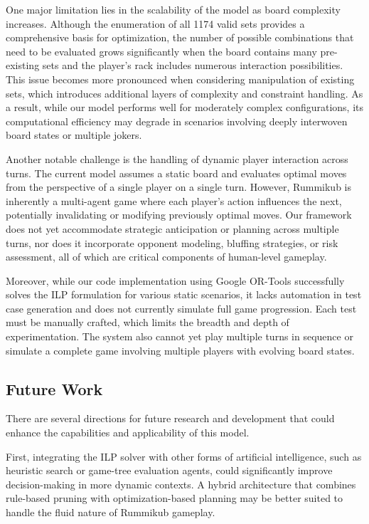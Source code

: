 \documentclass[11pt,letterpaper]{article}
\begin{document}
One major limitation lies in the scalability of the model as board complexity increases. Although the enumeration of all 1174 valid sets provides a comprehensive basis for optimization, the number of possible combinations that need to be evaluated grows significantly when the board contains many pre-existing sets and the player’s rack includes numerous interaction possibilities. This issue becomes more pronounced when considering manipulation of existing sets, which introduces additional layers of complexity and constraint handling. As a result, while our model performs well for moderately complex configurations, its computational efficiency may degrade in scenarios involving deeply interwoven board states or multiple jokers.

Another notable challenge is the handling of dynamic player interaction across turns. The current model assumes a static board and evaluates optimal moves from the perspective of a single player on a single turn. However, Rummikub is inherently a multi-agent game where each player’s action influences the next, potentially invalidating or modifying previously optimal moves. Our framework does not yet accommodate strategic anticipation or planning across multiple turns, nor does it incorporate opponent modeling, bluffing strategies, or risk assessment, all of which are critical components of human-level gameplay.

Moreover, while our code implementation using Google OR-Tools successfully solves the ILP formulation for various static scenarios, it lacks automation in test case generation and does not currently simulate full game progression. Each test must be manually crafted, which limits the breadth and depth of experimentation. The system also cannot yet play multiple turns in sequence or simulate a complete game involving multiple players with evolving board states.

\subsection*{Future Work}

There are several directions for future research and development that could enhance the capabilities and applicability of this model.

First, integrating the ILP solver with other forms of artificial intelligence, such as heuristic search or game-tree evaluation agents, could significantly improve decision-making in more dynamic contexts. A hybrid architecture that combines rule-based pruning with optimization-based planning may be better suited to handle the fluid nature of Rummikub gameplay.
\end{document}
